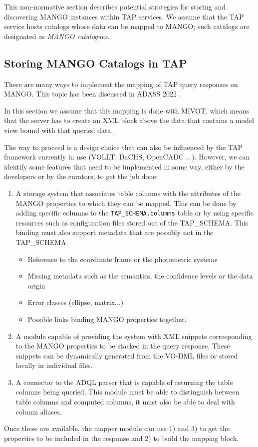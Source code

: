 This non-normative section describes potential strategies for
storing and discovering MANGO instances within TAP services.
We assume that the TAP service hosts catalogs whose data can be mapped to MANGO;
such catalogs are designated as \emph{MANGO catalogues}.

\subsection{Storing MANGO Catalogs in TAP}

There are many ways to implement the mapping of TAP query responses on MANGO.
This topic has been discussed in ADASS 2022 \citep{2024ASPC..535..259M}.

In this section we assume that this mapping is done with MIVOT, which means that the server has to create an 
XML block above the data that contains a model view bound with that queried data.

The way to proceed is a design choice that can also be influenced by the TAP 
framework currently in use (VOLLT, DaCHS, OpenCADC ...). 
However, we can identify some features that need to be implemented in some way, 
either by the developers or by the curators, to get the job done:

\begin{enumerate}
    \item A storage system that associates table columns with the attributes 
          of the MANGO properties to which they can be mapped. 
          This can be done by adding specific columns to the \texttt{TAP\_SCHEMA.columns} 
          table or by using specific resources such as configuration files stored out of the TAP\_SCHEMA.
          This binding must also support metadata that are possibly not in the TAP\_SCHEMA:
          \begin{itemize}
              \item Reference to the coordinate frame or the photometric systems
              \item Missing metadata such as the semantics, the confidence levels or the data origin
              \item Error classes (ellipse, matrix...)
              \item Possible links binding MANGO properties together.
          \end{itemize}
     \item A module capable of providing the system with XML snippets corresponding to the MANGO 
           properties to be stacked in the query response. These snippets can be 
           dynamically generated from the VO-DML files or stored locally in individual files.
     \item A connector to the ADQL parser that is capable of returning the table columns being queried.
           This module must be able to distinguish between table columns and computed columns,
           it must also be able to deal with column aliases.
\end{enumerate}

Once these are available, the mapper module can use 1) and 3) to get the properties to be included 
in the response and 2) to build the mapping block. 



